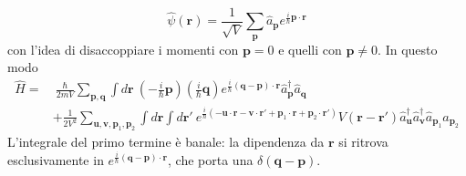 \documentclass[11pt, a4paper]{scrartcl}
\theoremstyle{style}
\theoremstyle{style1}
\numberwithin{equation}{subsection}
\begin{document}
\[
\hat{\psi }(\mathbf{r} ) = \frac{1}{\sqrt{V} } \sum_{\mathbf{p} }^{} \hat{a}_\mathbf{p}  e^{\frac{i}{\hbar }\mathbf{p} \cdot \mathbf{r} }
\] 
con l'idea di disaccoppiare i momenti con $\mathbf{p} =0$ e quelli con $\mathbf{p} \neq 0$.
In questo modo
\[
	\begin{split}
		\hat{H}= &\ \frac{\hbar }{2mV} \sum_{\mathbf{p} ,\mathbf{q} } \int d\mathbf{r}  \ \left(- \frac{i}{\hbar }\mathbf{p} \right) \left(\frac{i}{\hbar }\mathbf{q} \right) e^{\frac{i}{\hbar }(\mathbf{q} -\mathbf{p} ) \cdot \mathbf{r} }\hat{a}^\dagger _\mathbf{p} \hat{a}_\mathbf{q} \\
			 &+ \frac{1}{2V^2} \sum_{\mathbf{u} ,\mathbf{v} ,\mathbf{p}_1, \mathbf{p} _2}^{} \int d\mathbf{r} \int d\mathbf{r} ' \ e^{\frac{i}{\hbar }\left(- \mathbf{u} \cdot \mathbf{r} -\mathbf{v} \cdot \mathbf{r} ' + \mathbf{p} _1 \cdot \mathbf{r} + \mathbf{p} _2 \cdot \mathbf{r} '\right) } V(\mathbf{r} -\mathbf{r} ') \hat{a}^\dagger _\mathbf{u} \hat{a}^\dagger _\mathbf{v} \hat{a}_{\mathbf{p} _1} \hat{a}_{\mathbf{p} _2}
	\end{split}
\] 
L'integrale del primo termine \`e banale: la dipendenza da $\mathbf{r} $ si ritrova esclusivamente in $e^{\frac{i}{\hbar }(\mathbf{q} -\mathbf{p} ) \cdot \mathbf{r} }$, che porta una $\delta (\mathbf{q} - \mathbf{p} )$.
\end{document}
